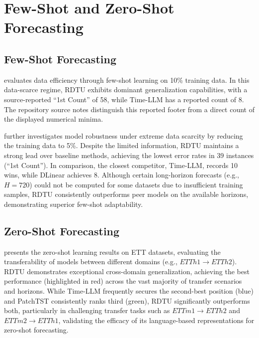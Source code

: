 
\section{Few-Shot and Zero-Shot Forecasting}\label{appx:few-zero-shot}

\subsection{Few-Shot Forecasting}



 evaluates data efficiency through few-shot learning on 10\% training data. In this data-scarce regime, RDTU exhibits dominant generalization capabilities, with a source-reported ``1st Count'' of 58, while Time-LLM has a reported count of 8. The repository source notes distinguish this reported footer from a direct count of the displayed numerical minima.



 further investigates model robustness under extreme data scarcity by reducing the training data to 5\%. Despite the limited information, RDTU maintains a strong lead over baseline methods, achieving the lowest error rates in 39 instances (``1st Count''). In comparison, the closest competitor, Time-LLM, records 10 wins, while DLinear achieves 8. Although certain long-horizon forecasts (e.g., $H=720$) could not be computed for some datasets due to insufficient training samples, RDTU consistently outperforms peer models on the available horizons, demonstrating superior few-shot adaptability.

\subsection{Zero-Shot Forecasting}



 presents the zero-shot learning results on ETT datasets, evaluating the transferability of models between different domains (e.g., $ETTh1 \to ETTh2$). RDTU demonstrates exceptional cross-domain generalization, achieving the best performance (highlighted in red) across the vast majority of transfer scenarios and horizons. While Time-LLM frequently secures the second-best position (blue) and PatchTST consistently ranks third (green), RDTU significantly outperforms both, particularly in challenging transfer tasks such as $ETTm1 \to ETTh2$ and $ETTm2 \to ETTh1$, validating the efficacy of its language-based representations for zero-shot forecasting.

